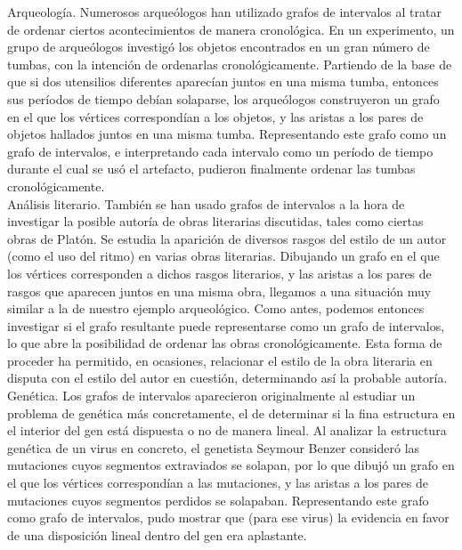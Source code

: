 Arqueología. Numerosos arqueólogos han utilizado grafos de intervalos al tratar de ordenar ciertos acontecimientos de manera cronológica. En un experimento, un grupo de arqueólogos investigó los objetos encontrados en un gran número de tumbas, con la intención de ordenarlas cronológicamente. Partiendo de la base de que si dos utensilios diferentes aparecían juntos en una misma tumba, entonces sus períodos de tiempo debían solaparse, los arqueólogos construyeron un grafo en el que los vértices correspondían a los objetos, y las aristas a los pares de objetos hallados juntos en una misma tumba. Representando este grafo como un grafo de intervalos, e interpretando cada intervalo como un período de tiempo durante el cual se usó el artefacto, pudieron finalmente ordenar las tumbas cronológicamente.\\

Análisis literario. También se han usado grafos de intervalos a la hora de investigar la posible autoría de obras literarias discutidas, tales como ciertas obras de Platón. Se estudia la aparición de diversos rasgos del estilo de un autor (como el uso del ritmo) en varias obras literarias. Dibujando un grafo en el que los vértices corresponden a dichos rasgos literarios, y las aristas a los pares de rasgos que aparecen juntos en una misma obra, llegamos a una situación muy similar a la de nuestro ejemplo arqueológico. Como antes, podemos entonces investigar si el grafo resultante puede representarse como un grafo de intervalos, lo que abre la posibilidad de ordenar las obras cronológicamente. Esta forma de proceder ha permitido, en ocasiones, relacionar el estilo de la obra literaria en disputa con el estilo del autor en cuestión, determinando así la probable autoría.\\

Genética. Los grafos de intervalos aparecieron originalmente al estudiar un problema de genética más concretamente, el de determinar si la fina estructura en el interior del gen está dispuesta o no de manera lineal. Al analizar la estructura genética de un virus en concreto, el genetista Seymour Benzer consideró las mutaciones cuyos segmentos extraviados se solapan, por lo que dibujó un grafo en el que los vértices correspondían a las mutaciones, y las aristas a los pares de mutaciones cuyos segmentos perdidos se solapaban. Representando este grafo como grafo de intervalos, pudo mostrar que (para ese virus) la evidencia en favor de una disposición lineal dentro del gen era aplastante.\\

